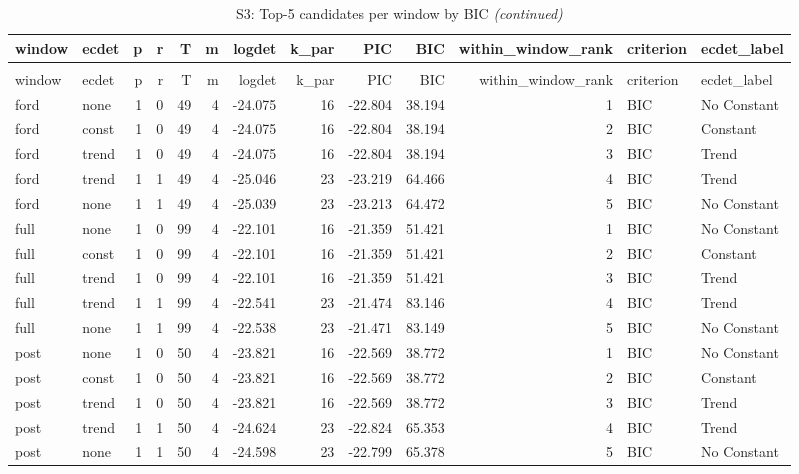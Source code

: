 \begingroup\fontsize{9}{11}\selectfont

\begin{longtable}[t]{llrrrrrrrrrll}
\caption{\label{tab:tab:S3_bic_top5}S3: Top-5 candidates per window by BIC}\\
\toprule
window & ecdet & p & r & T & m & logdet & k\_par & PIC & BIC & within\_window\_rank & criterion & ecdet\_label\\
\midrule
\endfirsthead
\caption[]{S3: Top-5 candidates per window by BIC \textit{(continued)}}\\
\toprule
window & ecdet & p & r & T & m & logdet & k\_par & PIC & BIC & within\_window\_rank & criterion & ecdet\_label\\
\midrule
\endhead

\endfoot
\bottomrule
\endlastfoot
ford & none & 1 & 0 & 49 & 4 & -24.075 & 16 & -22.804 & 38.194 & 1 & BIC & No Constant\\
ford & const & 1 & 0 & 49 & 4 & -24.075 & 16 & -22.804 & 38.194 & 2 & BIC & Constant\\
ford & trend & 1 & 0 & 49 & 4 & -24.075 & 16 & -22.804 & 38.194 & 3 & BIC & Trend\\
ford & trend & 1 & 1 & 49 & 4 & -25.046 & 23 & -23.219 & 64.466 & 4 & BIC & Trend\\
ford & none & 1 & 1 & 49 & 4 & -25.039 & 23 & -23.213 & 64.472 & 5 & BIC & No Constant\\
\addlinespace
full & none & 1 & 0 & 99 & 4 & -22.101 & 16 & -21.359 & 51.421 & 1 & BIC & No Constant\\
full & const & 1 & 0 & 99 & 4 & -22.101 & 16 & -21.359 & 51.421 & 2 & BIC & Constant\\
full & trend & 1 & 0 & 99 & 4 & -22.101 & 16 & -21.359 & 51.421 & 3 & BIC & Trend\\
full & trend & 1 & 1 & 99 & 4 & -22.541 & 23 & -21.474 & 83.146 & 4 & BIC & Trend\\
full & none & 1 & 1 & 99 & 4 & -22.538 & 23 & -21.471 & 83.149 & 5 & BIC & No Constant\\
\addlinespace
post & none & 1 & 0 & 50 & 4 & -23.821 & 16 & -22.569 & 38.772 & 1 & BIC & No Constant\\
post & const & 1 & 0 & 50 & 4 & -23.821 & 16 & -22.569 & 38.772 & 2 & BIC & Constant\\
post & trend & 1 & 0 & 50 & 4 & -23.821 & 16 & -22.569 & 38.772 & 3 & BIC & Trend\\
post & trend & 1 & 1 & 50 & 4 & -24.624 & 23 & -22.824 & 65.353 & 4 & BIC & Trend\\
post & none & 1 & 1 & 50 & 4 & -24.598 & 23 & -22.799 & 65.378 & 5 & BIC & No Constant\\*
\end{longtable}
\endgroup{}
